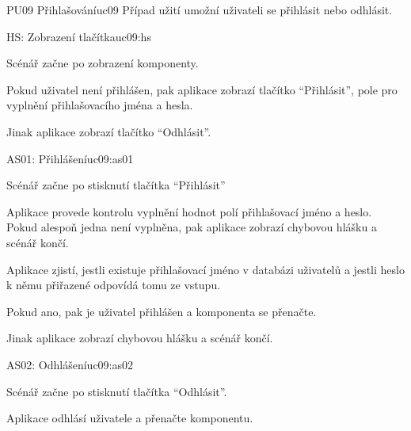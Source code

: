 \begin{usecase}{PU09 Přihlašování}{uc09}
    Případ užití umožní uživateli se přihlásit nebo odhlásit.

    \begin{scenario}{HS: Zobrazení tlačítka}{uc09:hs}
        \item Scénář začne po zobrazení komponenty.
        \item Pokud uživatel není přihlášen, pak aplikace zobrazí tlačítko \enquote{Přihlásit}, pole pro vyplnění přihlašovacího jména a hesla.
        \item Jinak aplikace zobrazí tlačítko \enquote{Odhlásit}.
    \end{scenario}


    \begin{scenario}{AS01: Přihlášení}{uc09:as01}
        \item Scénář začne po stisknutí tlačítka \enquote{Přihlásit}
        \item Aplikace provede kontrolu vyplnění hodnot polí přihlašovací jméno a heslo. Pokud alespoň jedna není vyplněna, pak aplikace zobrazí chybovou hlášku a scénář končí.
        \item Aplikace zjistí, jestli existuje přihlašovací jméno v databázi uživatelů a jestli heslo k němu přiřazené odpovídá tomu ze vstupu.
        \item Pokud ano, pak je uživatel přihlášen a komponenta se přenačte.
        \item Jinak aplikace zobrazí chybovou hlášku a scénář končí.
    \end{scenario}
    
    \begin{scenario}{AS02: Odhlášení}{uc09:as02}
        \item Scénář začne po stisknutí tlačítka \enquote{Odhlásit}.
        \item Aplikace odhlásí uživatele a přenačte komponentu.
    \end{scenario}
\end{usecase}